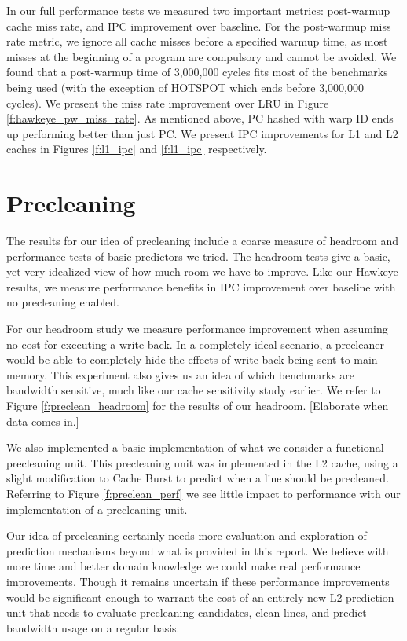 In our full performance tests we measured two important metrics: post-warmup cache miss rate, and IPC improvement over baseline. For the post-warmup miss rate metric, we ignore all cache misses before a specified warmup time, as most misses at the beginning of a program are compulsory and cannot be avoided. We found that a post-warmup time of 3,000,000 cycles fits most of the benchmarks being used (with the exception of HOTSPOT which ends before 3,000,000 cycles). We present the miss rate improvement over LRU in Figure \ref{f:hawkeye_pw_miss_rate}. As mentioned above, PC hashed with warp ID ends up performing better than just PC. We present IPC improvements for L1 and L2 caches in Figures \ref{f:l1_ipc} and \ref{f:l1_ipc} respectively.

\section{Precleaning}

The results for our idea of precleaning include a coarse measure of headroom and performance tests of basic predictors we tried. The headroom tests give a basic, yet very idealized view of how much room we have to improve. Like our Hawkeye results, we measure performance benefits in IPC improvement over baseline with no precleaning enabled.

For our headroom study we measure performance improvement when assuming no cost for executing a write-back. In a completely ideal scenario, a precleaner would be able to completely hide the effects of write-back being sent to main memory. This experiment also gives us an idea of which benchmarks are bandwidth sensitive, much like our cache sensitivity study earlier. We refer to Figure \ref{f:preclean_headroom} for the results of our headroom. [Elaborate when data comes in.]

We also implemented a basic implementation of what we consider a functional precleaning unit. This precleaning unit was implemented in the L2 cache, using a slight modification to Cache Burst \cite{cache_burst} to predict when a line should be precleaned. Referring to Figure \ref{f:preclean_perf} we see little impact to performance with our implementation of a precleaning unit.

Our idea of precleaning certainly needs more evaluation and exploration of prediction mechanisms beyond what is provided in this report. We believe with more time and better domain knowledge we could make real performance improvements. Though it remains uncertain if these performance improvements would be significant enough to warrant the cost of an entirely new L2 prediction unit that needs to evaluate precleaning candidates, clean lines, and predict bandwidth usage on a regular basis.
